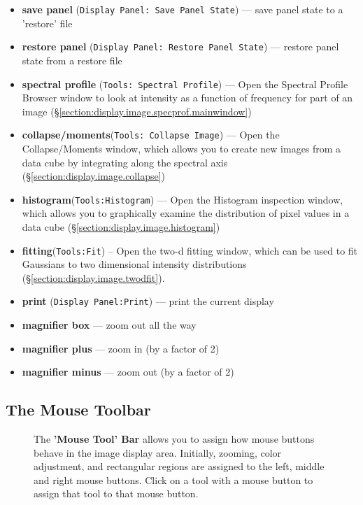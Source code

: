 \begin{itemize}
   \item  {\bf save panel} ({\tt Display Panel: Save Panel State}) --- save panel state to a 'restore' file
   \item  {\bf restore panel} ({\tt Display Panel: Restore Panel State}) --- restore panel state from a restore file
   \item  {\bf spectral profile} ({\tt Tools: Spectral Profile}) --- Open the Spectral Profile Browser window to look at intensity as a function of frequency for part of an image (\S \ref{section:display.image.specprof.mainwindow})
   \item  {\bf collapse/moments}({\tt Tools: Collapse Image}) --- Open the Collapse/Moments window, which allows you to create new images from a data cube by integrating along the spectral axis (\S \ref{section:display.image.collapse})
   \item  {\bf histogram}({\tt Tools:Histogram}) --- Open the Histogram inspection window, which allows you to graphically examine the distribution of pixel values in a data cube (\S \ref{section:display.image.histogram})
   \item  {\bf fitting}({\tt Tools:Fit}) -- Open the two-d fitting window, which can be used to fit Gaussians to two dimensional intensity distributions (\S \ref{section:display.image.twodfit}).
   \item {\bf print} ({\tt Display Panel:Print}) --- print the current display
   \item {\bf magnifier box} --- zoom out all the way
   \item {\bf magnifier plus} --- zoom in (by a factor of 2)
   \item {\bf magnifier minus} --- zoom out (by a factor of 2)
\end{itemize}

\subsection{The Mouse Toolbar}
\label{section:display.viewerGUI.displaypanel.mousetoolbar}

\begin{figure}[h!]
\begin{center}
\caption{\label{fig:viewer_mousetoolbar} The 
{\bf 'Mouse Tool' Bar} allows you to assign how mouse buttons behave in 
the image display area.  Initially, zooming, color adjustment, and rectangular 
regions are assigned to the left, middle and right mouse buttons. Click on a tool
with a mouse button to assign that tool to that mouse button.}
\hrulefill
\end{center}
\end{figure}

